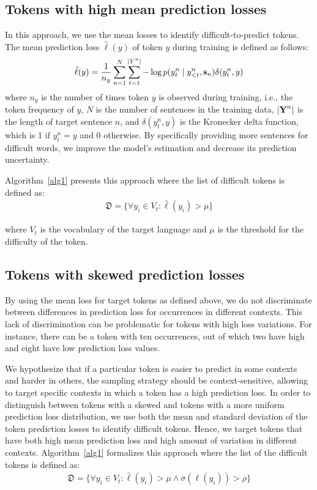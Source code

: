 \subsection{Tokens with high mean prediction losses}

In this approach, we use the mean losses to identify difficult-to-predict tokens. 
The mean prediction loss $\hat{\ell}(y)$ of token $y$ during training is defined as follows:
\begin{align}\label{ave}
\hat{\ell}(y) = \frac{1}{n_y}\sum_{n=1}^{N}\sum_{t=1}^{|Y^{n}|} -\log p(y^{n}_t \mid {y}^{n}_{<t}, \bm{\mathbf{s}}_n) \delta(y^n_t,y)
\end{align}
%
where $n_y$ is the number of times token $y$ is observed during training, i.e., the token frequency of $y$, $N$ is the
number of sentences in the training data, $|\bm{\mathbf{Y}}^{n}|$ is the length of target sentence $n$, and $\delta(y^n_t,y)$ is the Kronecker delta function, which is 1 if $y^n_t = y$ and 0 otherwise.
By specifically providing more sentences for difficult words, we improve the model's estimation and decrease its prediction uncertainty.


Algorithm~\ref{alg1} presents this approach where the list of difficult tokens is defined as: 
\begin{align}
\mathfrak{D} = \{\forall y_i \in V_t \colon \hat{\ell}(y_i) > \mu \}
\end{align}

\noindent
where $V_t$ is the vocabulary of the target language and $\mu$ is the threshold for the difficulty of the token.

\subsection{Tokens with skewed prediction losses}

By using the mean loss for target tokens as defined above, we do not discriminate between differences in prediction loss for occurrences in different contexts. This lack of discrimination can be problematic for tokens with high loss variations. For instance, there can be a token with ten occurrences, out of which two have high and eight have low prediction loss values. 

We hypothesize that if a particular token is easier to predict in some contexts and harder in others, the sampling strategy should be context-sensitive, allowing to target specific contexts in which a token has a high prediction loss. 
%
In order to distinguish between tokens with a skewed and tokens with a more uniform prediction loss distribution, we use both the mean and standard deviation of the token prediction losses to identify difficult tokens.
Hence, we target tokens that have both high mean prediction loss and high amount of variation in different contexts.
%
Algorithm~\ref{alg1} formalizes this approach where the list of the difficult tokens is defined as: 
\begin{align}
\mathfrak{D} = \{\forall y_i \in V_t \colon \hat{\ell}(y_i) > \mu \land \sigma(\ell(y_i)) > \rho \}
\end{align}

